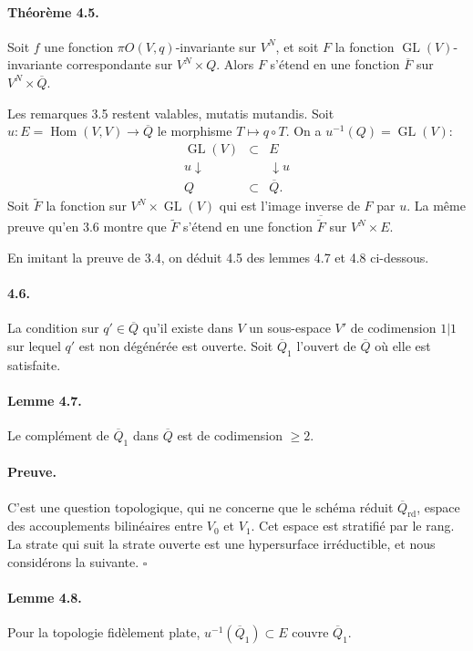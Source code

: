 \documentclass[11pt]{article}
\newcommand{\Hom}{\operatorname{Hom}}
\newcommand{\GL}{\operatorname{GL}}
\newcommand{\rd}{\mathrm{rd}}
\newcommand{\barQ}{\overline Q}
\begin{document}
\paragraph{Théorème 4.5.}
Soit $f$ une fonction $\pi O(V,q)$-invariante sur $V^N$, et soit $F$ la fonction $\GL(V)$-invariante correspondante sur $V^N\times Q$. Alors $F$ s'étend en une fonction $\overline F$ sur $V^N\times\barQ$.

Les remarques 3.5 restent valables, mutatis mutandis. Soit $u:E=\Hom(V,V)\to\barQ$ le morphisme $T\mapsto q\circ T$. On a $u^{-1}(Q)=\GL(V)$:
\begin{equation}
\label{eq:451}
\begin{array}{ccc}
\GL(V)&\subset&E\\
\scriptstyle u\downarrow&&\downarrow\scriptstyle u\\
Q&\subset&\barQ.
\end{array}
\end{equation}
Soit $\widetilde F$ la fonction sur $V^N\times\GL(V)$ qui est l'image inverse de $F$ par $u$. La même preuve qu'en 3.6 montre que $\widetilde F$ s'étend en une fonction $\overline{\widetilde F}$ sur $V^N\times E$.

En imitant la preuve de 3.4, on déduit 4.5 des lemmes 4.7 et 4.8 ci-dessous.

\paragraph{4.6.}
La condition sur $q'\in\barQ$ qu'il existe dans $V$ un sous-espace $V'$ de codimension $1|1$ sur lequel $q'$ est non dégénérée est ouverte. Soit $\barQ_1$ l'ouvert de $\barQ$ où elle est satisfaite.

\paragraph{Lemme 4.7.}
Le complément de $\barQ_1$ dans $\barQ$ est de codimension $\ge2$.

\paragraph{Preuve.}
C'est une question topologique, qui ne concerne que le schéma réduit $\barQ_{\rd}$, espace des accouplements bilinéaires entre $V_0$ et $V_1$. Cet espace est stratifié par le rang. La strate qui suit la strate ouverte est une hypersurface irréductible, et nous considérons la suivante. \hfill $\square$

\paragraph{Lemme 4.8.}
Pour la topologie fidèlement plate, $u^{-1}(\barQ_1)\subset E$ couvre $\barQ_1$.
\end{document}
